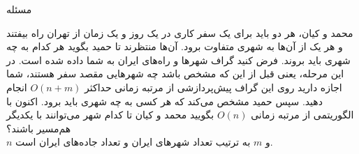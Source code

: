 ‌مسئله

محمد و کیان، هر دو باید برای یک سفر کاری در یک روز و یک زمان از تهران راه بیفتند و هر یک از آن‌ها به شهری متفاوت برود. آن‌ها منتظرند تا حمید بگوید هر کدام به چه شهری باید بروند. فرض کنید گراف شهرها و راه‌های ایران به شما داده شده است. در این مرحله، یعنی قبل از این که مشخص باشد چه شهرهایی مقصد سفر هستند، شما اجازه دارید روی این گراف پیش‌پردازشی از مرتبه زمانی حداکثر
$O(n+m)$
انجام دهید. سپس حمید مشخص می‌کند که هر کسی به چه شهری باید برود. اکنون با الگوریتمی از مرتبه زمانی
$O(n)$
بگویید محمد و کیان تا کدام شهر می‌توانند با یکدیگر هم‌مسیر باشند؟
\\
$n$ و $m$ به ترتیب تعداد شهر‌های ایران و تعداد جاده‌های ایران است.










